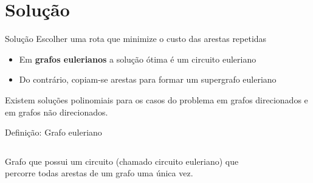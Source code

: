 \documentclass{beamer}
\begin{document}
\section{Solução}

\begin{frame}{Solução}
    Escolher uma rota que minimize o custo das arestas repetidas
    \begin{itemize}
        \item Em \textbf{grafos eulerianos} a solução ótima é um circuito euleriano
        \item Do contrário, copiam-se arestas para formar um supergrafo euleriano
    \end{itemize}

    Existem soluções polinomiais para os casos do problema em grafos direcionados e em grafos não direcionados.

    \vspace{10px}

    \begin{block}{Definição: Grafo euleriano}
        \begin{columns}
                Grafo que possui um circuito (chamado circuito euleriano) que percorre todas arestas de um grafo uma única vez. 


            \begin{figure}
                \centering
            \end{figure}

            \vspace{6px}
            
        \end{columns} 
    \end{block}

\end{frame}
\end{document}
